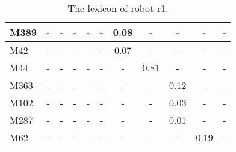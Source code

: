 \begin{table}[h]
{\begin{tabular}{||l|c|c|c|c|c|c|c|c|c|c||}
M389 & - & - & - & - & - & 0.08 & - & - & - & -\\\hline
M42 & - & - & - & - & - & 0.07 & - & - & - & -\\\hline
M44 & - & - & - & - & - & - & 0.81 & - & - & -\\\hline
M363 & - & - & - & - & - & - & - & 0.12 & - & -\\\hline
M102 & - & - & - & - & - & - & - & 0.03 & - & -\\\hline
M287 & - & - & - & - & - & - & - & 0.01 & - & -\\\hline
M62 & - & - & - & - & - & - & - & - & 0.19 & -\\\hline
\hline
\end{tabular}}
\caption{The lexicon of robot r1.}
\label{t:st:lexicon1}
\end{table}

